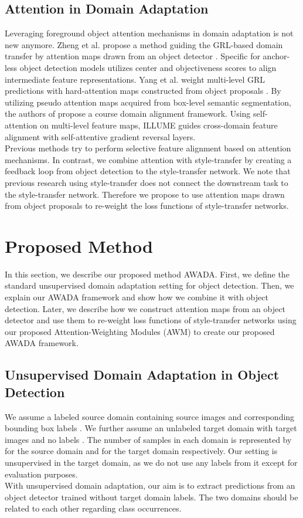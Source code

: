 \documentclass[10pt,twocolumn,letterpaper]{article}
\begin{document}
\subsection{Attention in Domain Adaptation}
Leveraging foreground object attention mechanisms in domain adaptation is not new anymore. Zheng et al. propose a method guiding the GRL-based domain transfer by attention maps drawn from an object detector \cite{CTF}. Specific for anchor-less object detection models \cite{EveryPixelMatters} utilizes center and objectiveness scores to align intermediate feature representations. Yang et al. weight multi-level GRL predictions with hard-attention maps constructed from object proposals \cite{FFDA}. By utilizing pseudo attention maps acquired from box-level semantic segmentation, the authors of \cite{C2FDA} propose a course domain alignment framework. Using self-attention on multi-level feature maps, ILLUME \cite{ILLUME} guides cross-domain feature alignment with self-attentive gradient reversal layers. \\
Previous methods try to perform selective feature alignment based on attention mechanisms. In contrast, we combine attention with style-transfer by creating a feedback loop from object detection to the style-transfer network. We note that previous research using style-transfer does not connect the downstream task to the style-transfer network. Therefore we propose to use attention maps drawn from object proposals to re-weight the loss functions of style-transfer networks.

\section{Proposed Method}
In this section, we describe our proposed method AWADA. First, we define the standard unsupervised domain adaptation setting for object detection. Then, we explain our AWADA framework and show how we combine it with object detection. Later, we describe how we construct attention maps from an object detector and use them to re-weight loss functions of style-transfer networks using our proposed Attention-Weighting Modules (AWM) to create our proposed AWADA framework.

\subsection{Unsupervised Domain Adaptation in Object Detection}
We assume a labeled source domain  containing source images  and corresponding bounding box labels . We further assume an unlabeled target domain  with target images  and no labels . The number of samples in each domain is represented by  for the source domain and  for the target domain respectively. Our setting is unsupervised in the target domain, as we do not use any labels from it except for evaluation purposes. \\
With unsupervised domain adaptation, our aim is to extract predictions  from an object detector trained without target domain labels. The two domains should be related to each other regarding class occurrences.
\end{document}

